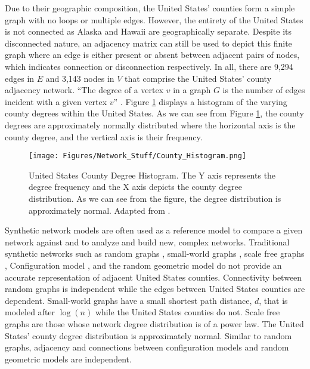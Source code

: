  Due to their geographic composition, the United States' counties form a simple graph with no loops or multiple edges.  However, the entirety of the United States is not connected as Alaska and Hawaii are geographically separate.  Despite its disconnected nature, an adjacency matrix can still be used to depict this finite graph where an edge is either present or absent between adjacent pairs of nodes, which indicates connection or disconnection respectively.  In all, there are 9,294 edges in $E$ and 3,143 nodes in $V$  that comprise the United States' county adjacency network.  ``The degree of a vertex $v$ in a graph $G$ is the number of edges incident with a given vertex $v$'' \cite{chartrand2012first}.  Figure \ref{fig:countyhist} displays a histogram of the varying county degrees within the United States.  As we can see from Figure \ref{fig:countyhist}, the county degrees are approximately normally distributed where the horizontal axis is the county degree, and the vertical axis is their frequency.  

\begin{figure}[h] %
\centering
\texttt{[image: Figures/Network\_Stuff/County\_Histogram.png]}
\caption[United States County Degree Histogram]{United States County Degree Histogram.  The Y axis represents the degree frequency and the X axis depicts the county degree distribution.  As we can see from the figure, the degree distribution is approximately normal.  Adapted from \cite{USCBAdjacency}.}
\label{fig:countyhist} %
\end{figure}

Synthetic network models are often used as a reference model to compare a given network against and to analyze and build new, complex networks.  Traditional synthetic networks such as random graphs \cite{erdHos1960evolution}, small-world graphs \cite{watts1998collective}, scale free graphs \cite{barabasi1999emergence}, Configuration model \cite{MolloyReed}, and the random geometric model \cite{gilbert1961random} do not provide an accurate representation of adjacent United States counties.  Connectivity between random graphs is independent while the edges between United States counties are dependent.  Small-world graphs have a small shortest path distance, $d$,  that is modeled after $\log(n)$ while the United States counties do not.  Scale free graphs are those whose network degree distribution is of a power law.  The United States' county degree distribution is approximately normal.  Similar to random graphs, adjacency and connections between configuration models and random geometric models are independent.

